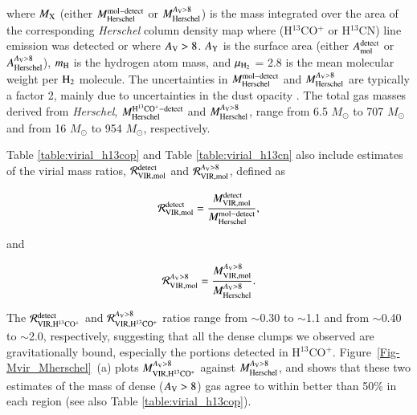 \documentclass{aa}
\begin{document}
\noindent where $M_{\rm X}$ (either $M_{\rm Herschel}^{\rm mol-detect}$ or $M_{\rm Herschel}^{A_{\rm V}>8}$)
is the mass integrated over the area of the corresponding {\it Herschel} column density map 
where (H$^{13}$CO$^+$ or H$^{13}$CN) line emission was detected or where $A_{\rm V} > 8$. 
$A_{\rm Y}$ is the surface area (either $A_{\rm mol}^{\rm detect}$ or $A_{\rm Herschel}^{A_{\rm V}>8}$), $m_{\rm H}$  is the hydrogen atom mass, 
and $\mu_{\rm H_2}$ = 2.8 is the mean molecular weight per ${\rm H_2}$ molecule. 
The uncertainties in $M_{\rm Herschel}^{\rm mol-detect}$ and $M_{\rm Herschel}^{A_{\rm V}>8}$ are typically a factor 2, 
mainly due to uncertainties in the dust opacity \citep[cf.][]{Roy14}. 
The total gas masses derived from {\it Herschel}, $M_{\rm Herschel}^{\rm H^{13}CO^+-detect}$ and $M_{\rm Herschel}^{A_{\rm V}>8}$, 
range from 6.5 $M_{\odot}$ to 707 $M_{\odot}$ and from 16 $M_{\odot}$ to 954 $M_{\odot}$, respectively.





Table \ref{table:virial_h13cop} and Table \ref{table:virial_h13cn} 
also include estimates of 
the virial mass ratios, $\mathcal{R}_{\rm VIR,mol}^{\rm detect}$ and $\mathcal{R}_{\rm VIR,mol}^{A_{\rm V}>8}$, defined as



\begin{equation}
\mathcal{R}_{\rm VIR,mol}^{\rm detect} = \frac{M_{\rm VIR,mol}^{\rm detect}}{M_{\rm Herschel}^{\rm mol-detect}},  
\end{equation}


\noindent and


\begin{equation}
\mathcal{R}_{\rm VIR,mol}^{A_{\rm V}>8} = \frac{M_{\rm VIR,mol}^{A_{\rm V}>8}}{M_{\rm Herschel}^{A_{\rm V}>8}}.  
\end{equation}


\noindent 
The $\mathcal{R}_{\rm VIR,H^{13}CO^{+}}^{\rm detect}$ and $\mathcal{R}_{\rm VIR,H^{13}CO^+}^{A_{\rm V}>8}$ ratios 
range from $\sim$0.30 to $\sim$1.1 and from $\sim$0.40 to $\sim$2.0, respectively, 
suggesting that {all the dense clumps we observed} are gravitationally bound, especially the portions detected in H$^{13}$CO$^+$. 
Figure~\ref{Fig-Mvir_Mherschel}~(a) plots $M_{\rm VIR,H^{13}CO^+}^{A_{\rm V}>8}$ against $M_{\rm Herschel}^{A_{\rm V}>8}$, 
and shows that these two estimates of the mass of dense ($A_{\rm V} > 8$) gas agree to within better than 50\% in each region 
(see also Table \ref{table:virial_h13cop}). 
\end{document}
